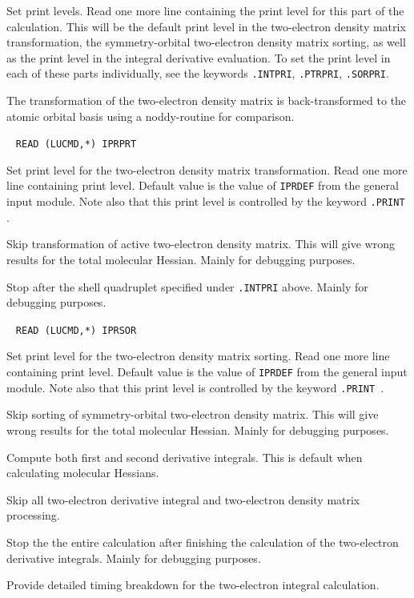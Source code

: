 \begin{description}
Set print levels.  Read one more line containing the print level for
this part of the calculation.  This will be the default print
level in the two-electron density matrix transformation, the
symmetry-orbital two-electron density matrix sorting, as well as the
print level in the integral derivative evaluation. To set the print
level in each of these parts individually, see the keywords
\verb|.INTPRI|, \verb|.PTRPRI|, \verb|.SORPRI|.

\item[\Key{PTRNOD}] The transformation of the two-electron density
matrix is back-transformed to the atomic orbital basis using a
noddy-routine for comparison.

\item[\Key{PTRPRI}]\verb| |\newline
\verb|READ (LUCMD,*) IPRPRT|

Set print level for the two-electron density matrix transformation.
Read one more line containing print level. Default value is the
value of  \verb|IPRDEF| from the general input module. Note also that
this print level is controlled by the keyword \verb|.PRINT |.

\item[\Key{PTRSKI}] Skip transformation of active two-electron
density matrix. This will give wrong results for the total molecular
Hessian. Mainly for debugging purposes.

\item[\Key{RETURN}] Stop after the shell quadruplet specified
under \verb|.INTPRI| above. Mainly for debugging purposes.

\item[\Key{SORPRI}]\verb| |\newline
\verb|READ (LUCMD,*) IPRSOR|

Set print level for the two-electron density matrix sorting. Read one
more line containing print level. Default value is the value of
\verb|IPRDEF| from the general input module. Note also that this print
level is controlled by the keyword \verb|.PRINT |.

\item[\Key{SORSKI}] Skip sorting of symmetry-orbital two-electron
density matrix. This will give wrong results for the total molecular
Hessian. Mainly for debugging purposes.

\item[\Key{SECOND}] Compute both first and second derivative
integrals. This is default when calculating molecular Hessians.

\item[\Key{SKIP}] Skip all two-electron derivative integral
and two-electron density matrix processing.

\item[\Key{STOP}] Stop the the entire calculation after finishing
the calculation of the two-electron derivative integrals. Mainly for
debugging purposes.

\item[\Key{TIME}] Provide detailed timing breakdown for the
two-electron integral calculation.
\end{description}

